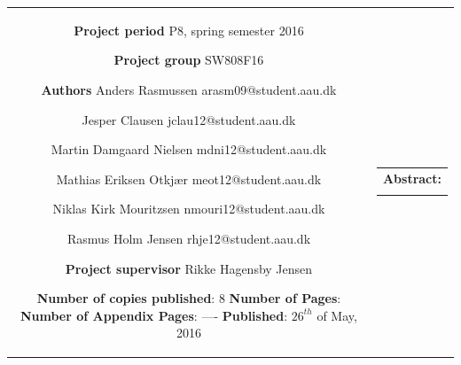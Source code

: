 \begin{nopagebreak}
{\begin{tabular}{cc}
{        \textbf{Project period} \\ 
        P8, spring semester 2016 \\

        \textbf{Project group} \\
        SW808F16 \\

        \textbf{Authors} \\
        Anders Rasmussen\\
        arasm09@student.aau.dk
        \\\\ 
        Jesper Clausen\\
        jclau12@student.aau.dk
        \\\\ 
        Martin Damgaard Nielsen\\
        mdni12@student.aau.dk
        \\\\ 
        Mathias Eriksen Otkjær\\
        meot12@student.aau.dk
        \\\\ 
        Niklas Kirk Mouritzsen\\
        nmouri12@student.aau.dk
        \\\\ 
        Rasmus Holm Jensen\\
        rhje12@student.aau.dk
        \\\\
        \textbf{Project supervisor} \\ 
        Rikke Hagensby Jensen \\

        \textbf{Number of copies published}: 8 \\
        \textbf{Number of Pages}: \pageref{LastPage} \\
        \textbf{Number of Appendix Pages}: ---- \\
        \textbf{Published}: $26^{th}$ of May, 2016 \\

        \vfill 

        } &
    \parbox{7cm}
    {
        \vspace{.15cm}
        \hfill 
        \begin{tabular}{l}
            {\bf Abstract:}\bigskip \\
            \fbox{
                \parbox{7cm}
                {
                    \bigskip
                    {\vfill{\small \bigskip}}
                }
            }
        \end{tabular}
    }

\end{tabular}}
\begin{center}
\end{center}

\restoregeometry
\end{nopagebreak}
